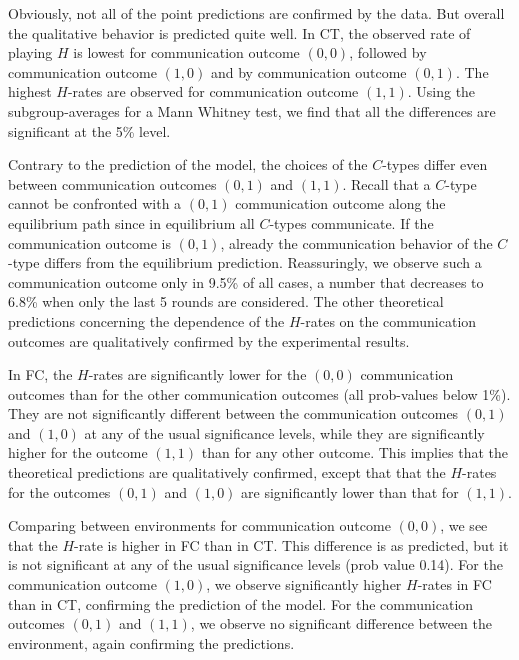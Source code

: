 \documentclass[12pt]{article}
\theoremstyle{break}
\begin{document}
Obviously, not all of the point predictions are confirmed by the data. But overall the qualitative behavior is predicted quite well. In CT, the observed rate of playing $H$ is lowest for communication outcome $(0,0)$, followed by communication outcome $(1,0)$ and by communication outcome $(0,1)$. The highest $H$-rates are observed for communication outcome $(1,1)$. Using the subgroup-averages for a Mann Whitney test, we find that all the differences are significant at the 5\% level. 

Contrary to the prediction of the model, the choices of the $C$-types differ even between communication outcomes $(0,1)$ and $(1,1)$. Recall that a $C$-type cannot be confronted with a $(0,1)$ communication outcome along the equilibrium path since in equilibrium all $C$-types communicate. If the communication outcome is $(0,1)$, already the communication behavior of the $C$-type differs from the equilibrium prediction. Reassuringly, we observe such a communication outcome only in 9.5\% of all cases, a number that decreases to 6.8\% when only the last 5 rounds are considered.
The other theoretical predictions concerning the dependence of the $H$-rates on the communication outcomes are qualitatively confirmed by the experimental results. 

In FC, the $H$-rates are significantly lower for the $(0,0)$ communication outcomes than for the other communication outcomes (all prob-values below 1\%). They are not significantly different between the communication outcomes $(0,1)$ and $(1,0)$ at any of the usual significance levels, while they are significantly higher for the outcome $(1,1)$ than for any other outcome. This implies that the theoretical predictions are qualitatively confirmed, except that that the $H$-rates for the outcomes $(0,1)$ and $(1,0)$ are significantly lower than that for $(1,1)$.

Comparing between environments for communication outcome $(0,0)$, we see that the $H$-rate is higher in FC than in CT. This difference is as predicted, but it is not significant at any of the usual significance levels (prob value 0.14). For the communication outcome $(1,0)$, we observe significantly higher $H$-rates in FC than in CT, confirming the prediction of the model. For the communication outcomes $(0,1)$ and $(1,1)$, we observe no significant difference between the environment, again confirming the predictions. 
\end{document}

